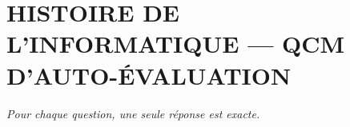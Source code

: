 
\section*{\textcolor{chapcolor}{\MakeUppercase{Histoire de l'informatique — QCM d'auto-évaluation}}}

\begin{center}
\textit{Pour chaque question, une seule réponse est exacte.}
\end{center}

